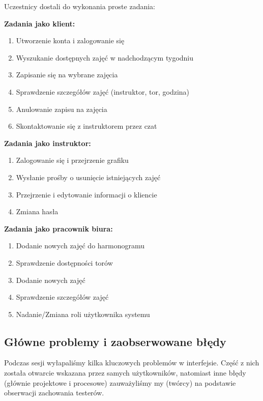 \documentclass[a4paper,12pt]{article}
\begin{document}
Uczestnicy dostali do wykonania proste zadania:
 
\vspace{0.3cm}
\noindent\textbf{Zadania jako klient:}
\begin{enumerate}
    \item Utworzenie konta i zalogowanie się
    \item Wyszukanie dostępnych zajęć w nadchodzącym tygodniu
    \item Zapisanie się na wybrane zajęcia
    \item Sprawdzenie szczegółów zajęć (instruktor, tor, godzina)
    \item Anulowanie zapisu na zajęcia
    \item Skontaktowanie się z instruktorem przez czat
\end{enumerate}
 
\vspace{0.3cm}
\noindent\textbf{Zadania jako instruktor:}
\begin{enumerate}
    \item Zalogowanie się i przejrzenie grafiku
    \item Wysłanie prośby o usunięcie istniejących zajęć
    \item Przejrzenie i edytowanie informacji o kliencie
    \item Zmiana hasła
\end{enumerate}
 
\vspace{0.3cm}
\noindent\textbf{Zadania jako pracownik biura:}
\begin{enumerate}
    \item Dodanie nowych zajęć do harmonogramu
    \item Sprawdzenie dostępności torów
    \item Dodanie nowych zajęć
    \item Sprawdzenie szczegółów zajęć
    \item Nadanie/Zmiana roli użytkownika systemu
\end{enumerate}
 
\subsection{Główne problemy i zaobserwowane błędy}
 
Podczas sesji wyłapaliśmy kilka kluczowych problemów w interfejsie. Część z nich została otwarcie wskazana przez samych użytkowników, natomiast inne błędy (głównie projektowe i procesowe) zauważyliśmy my (twórcy) na podstawie obserwacji zachowania testerów.
 
\end{document}
